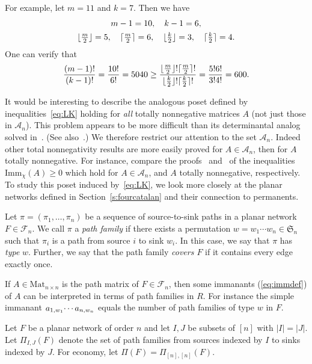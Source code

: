 \documentclass[12pt]{amsart}
\DeclarePairedDelimiter\ceil{\lceil}{\rceil}
\DeclarePairedDelimiter\floor{\lfloor}{\rfloor}
\theoremstyle{definition}
\numberwithin{equation}{section}
\newcommand{\sn}{\mathfrak{S}_n}
\newcommand{\imm}[1]{\mathrm{Imm}_{#1}}
\newcommand{\ntnsp}{\negthinspace}
\newcommand{\mat}[1]{\mathrm{Mat}_{#1 \times #1}}
\newcommand{\permmon}[2]{#1_{1,#2_1} \ntnsp\cdots #1_{n,#2_n}}
\newcommand{\F}{\mathcal F}
\begin{document}
For example, let $m=11$ and $k=7$. Then we have
\begin{gather*}
    m-1 = 10,\quad   k-1 = 6, \\
    \floor{\tfrac{m}{2}} = 5, \quad \ceil{\tfrac{m}{2}} = 6, \quad
    \floor{\tfrac{k}{2}} = 3, \quad \ceil{\tfrac{k}{2}} = 4.
\end{gather*}
One can verify that \begin{equation*}
    \frac{(m-1)!}{(k-1)!} = \frac{10!}{6!} = 5040 \geq \frac{\floor{\tfrac{m}{2}}!\ceil{\tfrac{m}{2}}!}{\floor{\tfrac{k}{2}}!\ceil{\tfrac{k}{2}}!} = \frac{5!6!}{3!4!} = 600.
\end{equation*}

It would be interesting to describe the analogous poset defined by inequalities~\eqref{eq:LK} holding for \emph{all} totally nonnegative matrices $A$ (not just those in $\mathcal{A}_n$). This problem appears to be more difficult than its determinantal analog solved in~\cite{FGJMult}. (See also~\cite{SkanIneq}.) We therefore restrict our attention to the set $\mathcal{A}_n$. Indeed other total nonnegativity results are more easily proved for $A\in\mathcal{A}_n$, then for $A$ totally nonnegative. For instance, compare the proofs~\cite[Thm. 2]{GashInc} and~\cite[Cor.3.2]{StemImm} of the inequalities $\imm{\chi}(A)\geq 0$ which hold for $A\in\mathcal{A}_n$, and $A$ totally nonnegative, respectively.
To study this poset induced by~\eqref{eq:LK}, we look more closely at the planar networks defined in Section~\ref{s:fourcatalan} and their connection to permanents.

Let $\pi=(\pi_1,\dotsc,\pi_n)$ be a sequence of source-to-sink paths in a
planar network $F \in \F_n$.
We call $\pi$ a \textit{path family} if there exists a permutation
$w=w_1\cdots w_n\in \sn$ such that $\pi_i$
is a path from source $i$ to sink $w_i$.
In this case, we say that $\pi$ has \emph{type} $w$.
Further, we say that the path family \emph{covers $F$}
if it contains every edge exactly once.

If $A \in \mat n$ is the path matrix of $F \in \F_n$, then some
immanants (\ref{eq:immdef}) of $A$
can be interpreted in terms of path families in $R$.  For instance
the simple immanant $\permmon aw$ equals the number of
path families of type $w$ in $F$.

Let $F$ be a planar network of order $n$ and let $I, J$ be subsets of $[n]$ with $|I|=|J|$. Let $\Pi_{I,J}(F)$ denote the set of path families from sources indexed by $I$ to sinks indexed by $J$. For economy, let $\Pi(F) = \Pi_{[n],[n]}(F)$.
\end{document}
